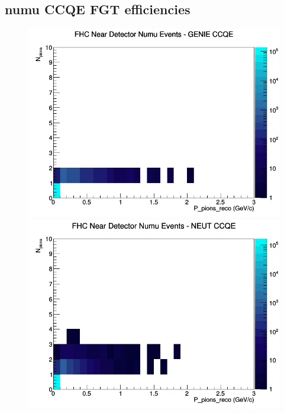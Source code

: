 \documentclass[12pt]{article}
\begin{document}
\subsection{numu CCQE FGT efficiencies}
\begin{figure}[h]
\includegraphics[width=\linewidth]{eff_N_P/FGT/pions/CCQE_FHC_ND_numu_N_P_GENIE.png}
\endminipage
{}
\includegraphics[width=\linewidth]{eff_N_P/FGT/pions/CCQE_FHC_ND_numu_N_P_NEUT.png}
\endminipage
{}

\end{figure}
\end{document}
